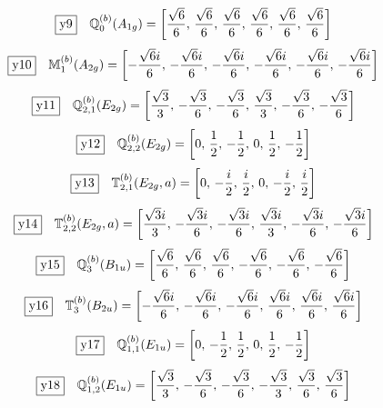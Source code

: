 \documentclass[fleqn,10pt,landscape]{jsarticle}
\begin{document}
\begin{dmath*}
\fbox{y9}\quad \mathbb{Q}_{0}^{(b)}(A_{1g})=\left[ \frac{\sqrt{6}}{6},\, \frac{\sqrt{6}}{6},\, \frac{\sqrt{6}}{6},\, \frac{\sqrt{6}}{6},\, \frac{\sqrt{6}}{6},\, \frac{\sqrt{6}}{6} \right]
\end{dmath*}
\begin{dmath*}
\fbox{y10}\quad \mathbb{M}_{1}^{(b)}(A_{2g})=\left[ - \frac{\sqrt{6} i}{6},\, - \frac{\sqrt{6} i}{6},\, - \frac{\sqrt{6} i}{6},\, - \frac{\sqrt{6} i}{6},\, - \frac{\sqrt{6} i}{6},\, - \frac{\sqrt{6} i}{6} \right]
\end{dmath*}
\begin{dmath*}
\fbox{y11}\quad \mathbb{Q}_{2,1}^{(b)}(E_{2g})=\left[ \frac{\sqrt{3}}{3},\, - \frac{\sqrt{3}}{6},\, - \frac{\sqrt{3}}{6},\, \frac{\sqrt{3}}{3},\, - \frac{\sqrt{3}}{6},\, - \frac{\sqrt{3}}{6} \right]
\end{dmath*}
\begin{dmath*}
\fbox{y12}\quad \mathbb{Q}_{2,2}^{(b)}(E_{2g})=\left[ 0,\, \frac{1}{2},\, - \frac{1}{2},\, 0,\, \frac{1}{2},\, - \frac{1}{2} \right]
\end{dmath*}
\begin{dmath*}
\fbox{y13}\quad \mathbb{T}_{2,1}^{(b)}(E_{2g},a)=\left[ 0,\, - \frac{i}{2},\, \frac{i}{2},\, 0,\, - \frac{i}{2},\, \frac{i}{2} \right]
\end{dmath*}
\begin{dmath*}
\fbox{y14}\quad \mathbb{T}_{2,2}^{(b)}(E_{2g},a)=\left[ \frac{\sqrt{3} i}{3},\, - \frac{\sqrt{3} i}{6},\, - \frac{\sqrt{3} i}{6},\, \frac{\sqrt{3} i}{3},\, - \frac{\sqrt{3} i}{6},\, - \frac{\sqrt{3} i}{6} \right]
\end{dmath*}
\begin{dmath*}
\fbox{y15}\quad \mathbb{Q}_{3}^{(b)}(B_{1u})=\left[ \frac{\sqrt{6}}{6},\, \frac{\sqrt{6}}{6},\, \frac{\sqrt{6}}{6},\, - \frac{\sqrt{6}}{6},\, - \frac{\sqrt{6}}{6},\, - \frac{\sqrt{6}}{6} \right]
\end{dmath*}
\begin{dmath*}
\fbox{y16}\quad \mathbb{T}_{3}^{(b)}(B_{2u})=\left[ - \frac{\sqrt{6} i}{6},\, - \frac{\sqrt{6} i}{6},\, - \frac{\sqrt{6} i}{6},\, \frac{\sqrt{6} i}{6},\, \frac{\sqrt{6} i}{6},\, \frac{\sqrt{6} i}{6} \right]
\end{dmath*}
\begin{dmath*}
\fbox{y17}\quad \mathbb{Q}_{1,1}^{(b)}(E_{1u})=\left[ 0,\, - \frac{1}{2},\, \frac{1}{2},\, 0,\, \frac{1}{2},\, - \frac{1}{2} \right]
\end{dmath*}
\begin{dmath*}
\fbox{y18}\quad \mathbb{Q}_{1,2}^{(b)}(E_{1u})=\left[ \frac{\sqrt{3}}{3},\, - \frac{\sqrt{3}}{6},\, - \frac{\sqrt{3}}{6},\, - \frac{\sqrt{3}}{3},\, \frac{\sqrt{3}}{6},\, \frac{\sqrt{3}}{6} \right]
\end{dmath*}
\end{document}
